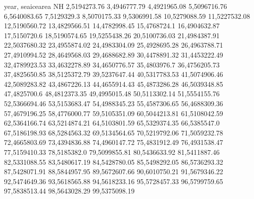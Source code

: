 year,    seaicearea NH
2,5194273.76
3,4946777.79
4,4921965.08
5,5096716.76
6,5640083.65
7,5129329.3
8,5070175.33
9,5306991.58
10,5279088.59
11,5227532.08
12,5190560.72
13,4829566.51
14,4782998.45
15,4768724.1
16,4904632.87
17,5150720.6
18,5190574.65
19,5255438.26
20,5100736.03
21,4984387.91
22,5037680.32
23,4955874.02
24,4983304.09
25,4928695.28
26,4963788.71
27,4910994.52
28,4649568.03
29,4688682.89
30,4478891.32
31,4453222.49
32,4789923.53
33,4632278.89
34,4650776.57
35,4803976.7
36,4756205.73
37,4825650.85
38,5125372.79
39,5237647.44
40,5317783.53
41,5074906.46
42,5089283.82
43,4867226.13
44,4655914.43
45,4873286.28
46,5039348.85
47,4825700.6
48,4812373.35
49,4995015.48
50,5113302.14
51,5554155.76
52,5366694.46
53,5153683.47
54,4988345.23
55,4587306.65
56,4688309.36
57,4679196.25
58,4776000.77
59,5105351.09
60,5044213.81
61,5108042.59
62,5364166.74
63,5214874.21
64,5103801.59
65,5329374.35
66,5385547.0
67,5186198.93
68,5284563.32
69,5134564.65
70,5219792.06
71,5059232.78
72,4665803.69
73,4394836.88
74,4960147.72
75,4831912.49
76,4931538.47
77,5159410.33
78,5185382.0
79,5099855.81
80,5436633.92
81,5411887.46
82,5331088.55
83,5480617.19
84,5428780.05
85,5498292.05
86,5736293.32
87,5428071.91
88,5844957.95
89,5672607.66
90,6010750.21
91,5679346.22
92,5474649.36
93,5618565.88
94,5618233.16
95,5728457.33
96,5799759.65
97,5838513.44
98,5643028.29
99,5375098.19
